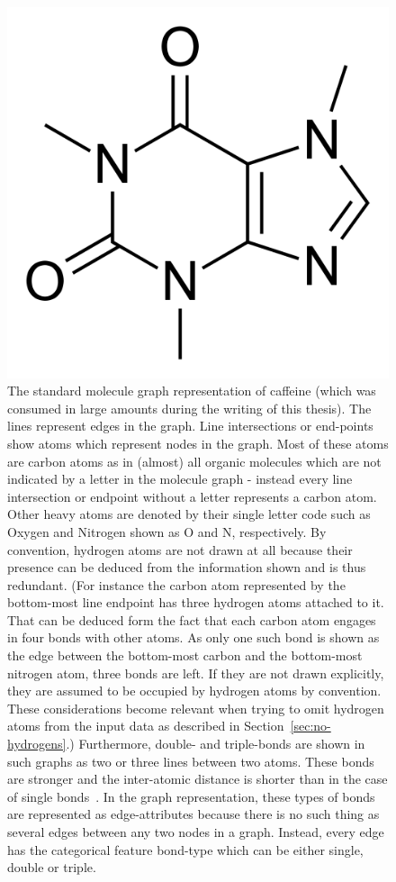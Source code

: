 \begin{figure}[H]
	\centering
	\includegraphics[width=0.6\linewidth]{figures/caffeine}
	\caption{The standard molecule graph representation of caffeine (which was consumed in large amounts during the writing of this thesis). The lines represent edges in the graph. Line intersections or end-points show atoms which represent nodes in the graph. Most of these atoms are carbon atoms as in (almost) all organic molecules which are not indicated by a letter in the molecule graph - instead every line intersection or endpoint without a letter represents a carbon atom. Other heavy atoms are denoted by their single letter code such as Oxygen and Nitrogen shown as O and N, respectively.
	By convention, hydrogen atoms are not drawn at all because their presence can be deduced from the information shown and is thus redundant. (For instance the carbon atom represented by the bottom-most line endpoint has three hydrogen atoms attached to it. That can be deduced form the fact that each carbon atom engages in four bonds with other atoms. As only one such bond is shown as the edge between the bottom-most carbon and the bottom-most nitrogen atom, three bonds are left. If they are not drawn explicitly, they are assumed to be occupied by hydrogen atoms by convention. These considerations become relevant when trying to omit hydrogen atoms from the input data as described in Section~\ref{sec:no-hydrogens}.)
	Furthermore, double- and triple-bonds are shown in such graphs as two or three lines between two atoms. These bonds are stronger and the inter-atomic distance is shorter than in the case of single bonds~\cite{Organic-chemistry}. In the graph representation, these types of bonds are represented as edge-attributes because there is no such thing as several edges between any two nodes in a graph. Instead, every edge has the categorical feature bond-type which can be either single, double or triple.
	}
	\label{fig:caffeine}
\end{figure}


